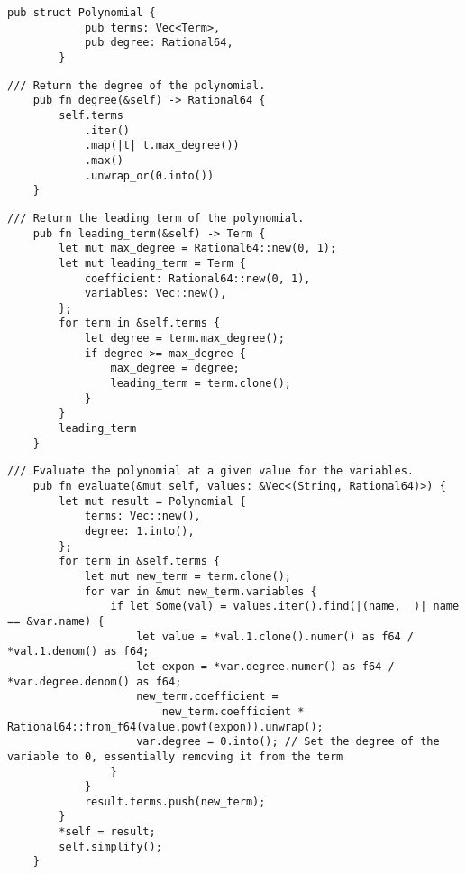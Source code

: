 \begin{minipage}{\linewidth}
    \begin{lstlisting}[caption={The \texttt{Polynomial} struct}, label={lst:polynomial}]
        pub struct Polynomial {
            pub terms: Vec<Term>,
            pub degree: Rational64,
        }
    \end{lstlisting}
\end{minipage}

\begin{lstlisting}[caption={The implementation of the \texttt{degree()} method for the \texttt{Polynomial} struct}, label={lst:polynomial-degree}]
    /// Return the degree of the polynomial.
    pub fn degree(&self) -> Rational64 {
        self.terms
            .iter()
            .map(|t| t.max_degree())
            .max()
            .unwrap_or(0.into())
    }
\end{lstlisting}

\begin{lstlisting}[caption={The implementation of the \texttt{leading\_term()} method for the \texttt{Polynomial} struct}, label={lst:polynomial-leading-term}]
    /// Return the leading term of the polynomial.
    pub fn leading_term(&self) -> Term {
        let mut max_degree = Rational64::new(0, 1);
        let mut leading_term = Term {
            coefficient: Rational64::new(0, 1),
            variables: Vec::new(),
        };
        for term in &self.terms {
            let degree = term.max_degree();
            if degree >= max_degree {
                max_degree = degree;
                leading_term = term.clone();
            }
        }
        leading_term
    }
\end{lstlisting}

\begin{lstlisting}[caption={The implementation of the \texttt{evaluate()} method for the \texttt{Polynomial} struct}, label={lst:polynomial-evaluate}]
    /// Evaluate the polynomial at a given value for the variables.
    pub fn evaluate(&mut self, values: &Vec<(String, Rational64)>) {
        let mut result = Polynomial {
            terms: Vec::new(),
            degree: 1.into(),
        };
        for term in &self.terms {
            let mut new_term = term.clone();
            for var in &mut new_term.variables {
                if let Some(val) = values.iter().find(|(name, _)| name == &var.name) {
                    let value = *val.1.clone().numer() as f64 / *val.1.denom() as f64;
                    let expon = *var.degree.numer() as f64 / *var.degree.denom() as f64;
                    new_term.coefficient =
                        new_term.coefficient * Rational64::from_f64(value.powf(expon)).unwrap();
                    var.degree = 0.into(); // Set the degree of the variable to 0, essentially removing it from the term
                }
            }
            result.terms.push(new_term);
        }
        *self = result;
        self.simplify();
    }
\end{lstlisting}

